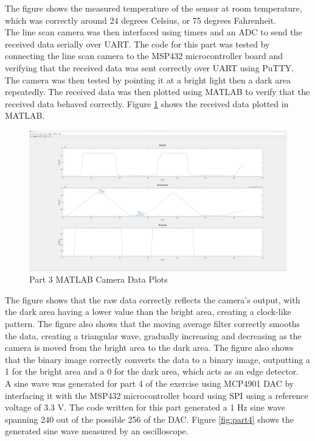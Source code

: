 \documentclass[CMPE]{KGCOEReport}
\begin{document}
The figure shows the measured temperature of the sensor at room temperature, which was correctly around 24 degrees Celsius, or 75 degrees Fahrenheit.\\

The line scan camera was then interfaced using timers and an ADC to send the received data serially over UART. The code for this part was tested by connecting the line scan camera to the MSP432 microcontroller board and verifying that the received data was sent correctly over UART using PuTTY.\\

The camera was then tested by pointing it at a bright light then a dark area repeatedly. The received data was then plotted using MATLAB to verify that the received data behaved correctly. Figure \ref{fig:part3} shows the received data plotted in MATLAB.

\begin{figure}[H]
    \centering
    \includegraphics[width=1.00\textwidth]{part3.png}
    \caption{Part 3 MATLAB Camera Data Plots}
    \label{fig:part3}
\end{figure}

The figure shows that the raw data correctly reflects the camera's output, with the dark area having a lower value than the bright area, creating a clock-like pattern. The figure also shows that the moving average filter correctly smooths the data, creating a triangular wave, gradually increasing and decreasing as the camera is moved from the bright area to the dark area. The figure also shows that the binary image correctly converts the data to a binary image, outputting a 1 for the bright area and a 0 for the dark area, which acts as an edge detector.\\

A sine wave was generated for part 4 of the exercise using MCP4901 DAC by interfacing it with the MSP432 microcontroller board using SPI using a reference voltage of 3.3 V. The code written for this part generated a 1 Hz sine wave spanning 240 out of the possible 256 of the DAC. Figure \ref{fig:part4} shows the generated sine wave measured by an oscilloscope.
\end{document}
